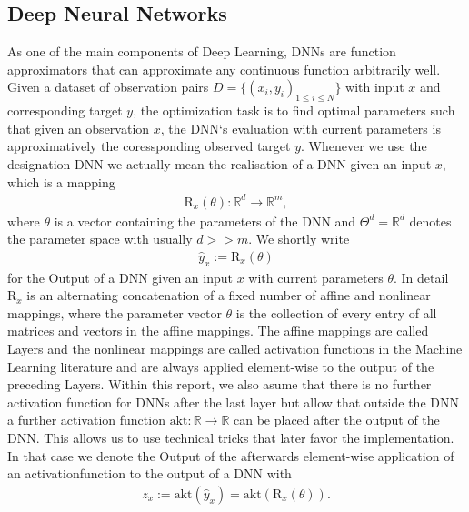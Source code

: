 \documentclass[conference]{IEEEtran}
\begin{document}
\subsection{Deep Neural Networks}
As one of the main components of Deep Learning, DNNs are function approximators that can approximate any continuous function arbitrarily well. Given a dataset of observation pairs $D =\{(x_{i}, y_{i})_{1\leq i\leq N}\}$ with input ${x}$ and corresponding target $y$, the optimization task is to find optimal parameters such that given an observation $x$, the DNN`s evaluation with current parameters is approximatively the coressponding observed target $y$.  Whenever we use the designation
DNN we actually mean the realisation of a DNN given an input $x$, which is a mapping
\begin{align}
\mathrm{R}_{x}(\theta):\mathbb{R}^{d}\rightarrow\mathbb{R}^{m},
\end{align}
where $\theta$ is a vector containing the parameters of the DNN and $\Theta^{d}=\mathbb{R}^{d}$ denotes the parameter space with usually $d >> m$. We shortly write 
\begin{align} 
\hat{y}_{x} := \mathrm{R}_{x}(\theta)
\end{align}
for the Output of a DNN given an input $x$ with current parameters $\theta$. In detail $\mathrm{R}_{x}$ is an alternating concatenation of a fixed number of affine and nonlinear mappings, where the parameter vector $\theta$ is the collection of every entry of all matrices and vectors in the affine mappings. The affine mappings are called Layers and the nonlinear mappings are called activation functions in the Machine Learning literature and are always applied element-wise to the output of the preceding Layers. %
Within this report, we also asume that there is no further activation function for DNNs after the last layer but allow that outside the DNN a further activation function $\text{akt}:\mathbb{R}\rightarrow\mathbb{R}$ can be placed after the output of the DNN. This allows us to use technical tricks that later favor the implementation.
In that case we denote the Output of the afterwards element-wise application of an activationfunction to the output of a DNN with
\begin{align}
z_{x} := \text{akt}(\hat{y}_{x}) = \text{akt}(\mathrm{R}_{x}(\theta)).
\end{align}
\end{document}
